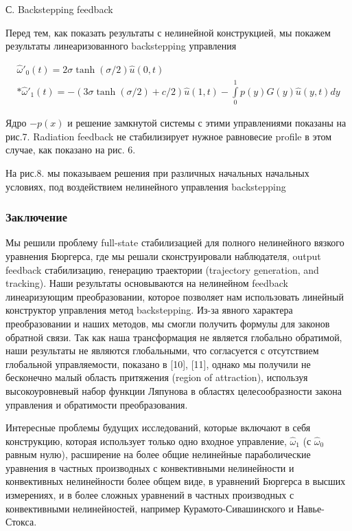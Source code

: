 С. Backstepping feedback

Перед тем, как показать результаты с нелинейной конструкцией, мы покажем результаты линеаризованного backstepping управления


\begin{gather}\label{cl_controller}
  \hat{\omega}'_0(t) = 2\sigma\tanh({\sigma/2})\hat{u}(0, t)\\*
  \hat{\omega}'_1(t) = -(3\sigma\tanh{(\sigma/2)} + c/2)\hat{u}(1, t) - \int\limits_0^1{p(y)G(y)\hat{u}(y, t)dy}
\end{gather}


Ядро $-p(x)$ и решение замкнутой системы с этими управлениями показаны на рис.7. Radiation feedback не стабилизирует нужное равновесие profile в этом случае, как показано на рис. 6.

На рис.8. мы показываем решения при различных начальных начальных условиях, под воздействием нелинейного управления backstepping

\subsubsection{Заключение}

Мы решили проблему full-state стабилизацией для полного нелинейного вязкого уравнения Бюргерса, где мы решали сконструировали наблюдателя, output feedback стабилизацию, генерацию траектории (trajectory generation, and tracking). Наши результаты основываются на нелинейном feedback линеаризующим преобразовании, которое позволяет нам использовать линейный конструктор управления метод backstepping. Из-за явного характера преобразовании и наших методов, мы смогли получить формулы для законов обратной связи. Так как наша трансформация не является глобально обратимой, наши результаты не являются глобальными, что согласуется с отсутствием глобальной управляемости, показано в [10], [11], однако мы получили не бесконечно малый область притяжения (region of attraction), используя высокоуровневый набор функции Ляпунова в областях целесообразности закона управления и обратимости преобразования. 

Интересные проблемы будущих исследований, которые включают в себя конструкцию, которая использует только одно входное управление, $\hat{\omega}_1$ (с $\hat{\omega}_0$ равным нулю), расширение на более общие нелинейные параболические уравнения в частных производных с конвективными нелинейности и конвективных нелинейности более общем виде, в уравнений Бюргерса в высших измерениях, и в более сложных уравнений в частных производных с конвективными нелинейностей, например Курамото-Сивашинского и Навье-Стокса.